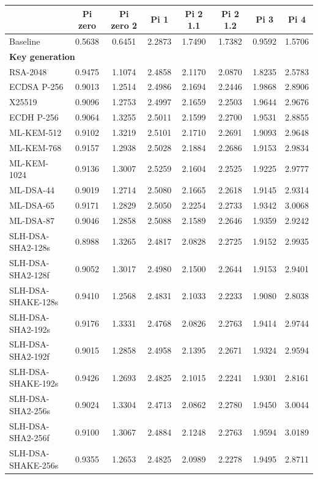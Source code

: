 \documentclass[11pt, letterpaper]{article}
\begin{document}
\begin{table}[H]
\centering
\scriptsize
\caption{FNB58 average power readings in Watts across Raspberry Pi models}
\begin{longtable}{lccccccc}

\hline
 & Pi zero & Pi zero 2 & Pi 1 & Pi 2 1.1 & Pi 2 1.2 & Pi 3 & Pi 4 \\
\hline

Baseline & 0.5638 & 0.6451 & 2.2873 & 1.7490 & 1.7382 & 0.9592 & 1.5706 \\

\hline
\multicolumn{8}{l}{\textbf{Key generation}} \\

RSA-2048 & 0.9475 & 1.1074 & 2.4858 & 2.1170 & 2.0870 & 1.8235 & 2.5783 \\
ECDSA P-256 & 0.9013 & 1.2514 & 2.4986 & 2.1694 & 2.2446 & 1.9868 & 2.8906 \\
X25519 & 0.9096 & 1.2753 & 2.4997 & 2.1659 & 2.2503 & 1.9644 & 2.9676 \\
ECDH P-256 & 0.9064 & 1.3255 & 2.5011 & 2.1599 & 2.2700 & 1.9531 & 2.8855 \\
ML-KEM-512 & 0.9102 & 1.3219 & 2.5101 & 2.1710 & 2.2691 & 1.9093 & 2.9648 \\
ML-KEM-768 & 0.9157 & 1.2938 & 2.5028 & 2.1884 & 2.2686 & 1.9153 & 2.9834 \\
ML-KEM-1024 & 0.9136 & 1.3007 & 2.5259 & 2.1604 & 2.2525 & 1.9225 & 2.9777 \\
ML-DSA-44 & 0.9019 & 1.2714 & 2.5080 & 2.1665 & 2.2618 & 1.9145 & 2.9314 \\
ML-DSA-65 & 0.9171 & 1.2829 & 2.5050 & 2.2254 & 2.2733 & 1.9342 & 3.0068 \\
ML-DSA-87 & 0.9046 & 1.2858 & 2.5088 & 2.1589 & 2.2646 & 1.9359 & 2.9242 \\
SLH-DSA-SHA2-128s & 0.8988 & 1.3265 & 2.4817 & 2.0828 & 2.2725 & 1.9152 & 2.9935 \\
SLH-DSA-SHA2-128f & 0.9052 & 1.3017 & 2.4980 & 2.1500 & 2.2644 & 1.9153 & 2.9401 \\
SLH-DSA-SHAKE-128s & 0.9410 & 1.2568 & 2.4831 & 2.1033 & 2.2233 & 1.9080 & 2.8038 \\
SLH-DSA-SHA2-192s & 0.9176 & 1.3331 & 2.4768 & 2.0826 & 2.2763 & 1.9414 & 2.9744 \\
SLH-DSA-SHA2-192f & 0.9015 & 1.2858 & 2.4958 & 2.1395 & 2.2671 & 1.9324 & 2.9594 \\
SLH-DSA-SHAKE-192s & 0.9426 & 1.2693 & 2.4825 & 2.1015 & 2.2241 & 1.9301 & 2.8161 \\
SLH-DSA-SHA2-256s & 0.9024 & 1.3304 & 2.4713 & 2.0862 & 2.2780 & 1.9450 & 3.0044 \\
SLH-DSA-SHA2-256f & 0.9100 & 1.3067 & 2.4884 & 2.1248 & 2.2763 & 1.9594 & 3.0189 \\
SLH-DSA-SHAKE-256s & 0.9355 & 1.2653 & 2.4825 & 2.0989 & 2.2278 & 1.9495 & 2.8711 \\


\end{longtable}
\end{table}
\end{document}
